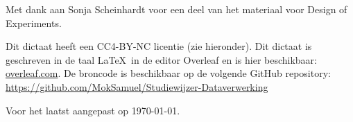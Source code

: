 \documentclass[a4paper,12pt,oneside]{book}
\begin{document}
Met dank aan Sonja Scheinhardt voor een deel van het materiaal voor Design of Experiments.

Dit dictaat heeft een CC4-BY-NC licentie (zie hieronder). Dit dictaat is geschreven in de taal \LaTeX\ in de editor Overleaf en is hier beschikbaar: \href{https://www.overleaf.com/read/sgpyzkvsfkpc
}{overleaf.com}. De broncode is beschikbaar op de volgende GitHub repository: \href{https://github.com/MokSamuel/Studiewijzer-Dataverwerking}{https://github.com/MokSamuel/Studiewijzer-Dataverwerking}

Voor het laatst aangepast op \today.
\doclicenseThis


\tableofcontents


\setcounter{page}{1}










\begin{appendices}


\end{appendices}
\end{document}
